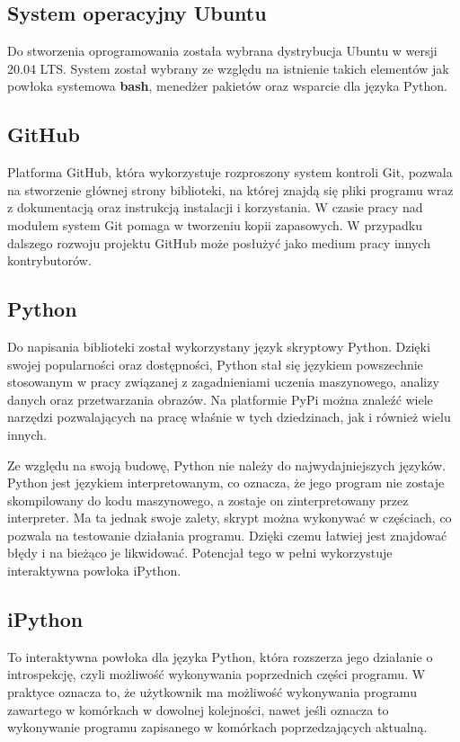 \subsection{System operacyjny Ubuntu}
\quad Do stworzenia oprogramowania została wybrana dystrybucja Ubuntu w wersji 20.04 LTS. System został wybrany ze względu na istnienie takich elementów jak powłoka systemowa \textbf{bash}, menedżer pakietów oraz wsparcie dla języka Python. 

\subsection{GitHub}
\quad Platforma GitHub, która wykorzystuje rozproszony system kontroli Git, pozwala na stworzenie głównej strony biblioteki, na której znajdą się pliki programu wraz z dokumentacją oraz instrukcją instalacji i korzystania. W czasie pracy nad modułem system Git pomaga w tworzeniu kopii zapasowych. W przypadku dalszego rozwoju projektu GitHub może posłużyć jako medium pracy innych kontrybutorów. 

\subsection{Python}
\quad Do napisania biblioteki został wykorzystany język skryptowy Python. Dzięki swojej popularności oraz dostępności, Python stał się językiem powszechnie stosowanym w pracy związanej z zagadnieniami uczenia maszynowego, analizy danych oraz przetwarzania obrazów. Na platformie PyPi można znaleźć wiele narzędzi pozwalających na pracę właśnie w tych dziedzinach, jak i również wielu innych. 

\quad Ze względu na swoją budowę, Python nie należy do najwydajniejszych języków. Python jest językiem interpretowanym, co oznacza, że jego program nie zostaje skompilowany do kodu maszynowego, a zostaje on zinterpretowany przez interpreter. Ma ta jednak swoje zalety, skrypt można wykonywać w częściach, co pozwala na testowanie działania programu. Dzięki czemu łatwiej jest znajdować błędy i na bieżąco je likwidować. Potencjał tego w pełni wykorzystuje interaktywna powłoka iPython. 

\subsection{iPython}
\quad To interaktywna powłoka dla języka Python, która rozszerza jego działanie o introspekcję, czyli możliwość wykonywania poprzednich części programu. W praktyce oznacza to, że użytkownik ma możliwość wykonywania programu zawartego w komórkach w dowolnej kolejności, nawet jeśli oznacza to wykonywanie programu zapisanego w komórkach poprzedzających aktualną. 

